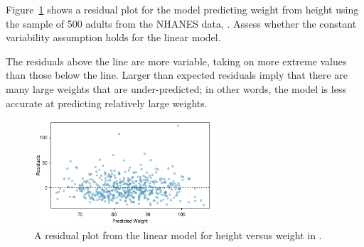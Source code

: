 \begin{examplewrap}
\begin{nexample}{Figure~\ref{nhanesHeightWeightResidualPlot} shows a residual plot for the model predicting weight from height using the sample of 500 adults from the NHANES data, . Assess whether the constant variability assumption holds for the linear model.}

The residuals above the line are more variable, taking on more extreme values than those below the line. Larger than expected residuals imply that there are many large weights that are under-predicted; in other words, the model is less accurate at predicting relatively large weights.
\end{nexample}
\end{examplewrap}

\begin{figure}[h]
	\centering
	\includegraphics[width=0.6\textwidth]
	{ch_09a_simple_linear_regression_oi_biostat/figures/nhanesHeightWeightResidualPlot/nhanesHeightWeightResidualPlot.pdf}
	\caption{A residual plot from the linear model for height versus weight in .}
	\label{nhanesHeightWeightResidualPlot}
\end{figure}






 
